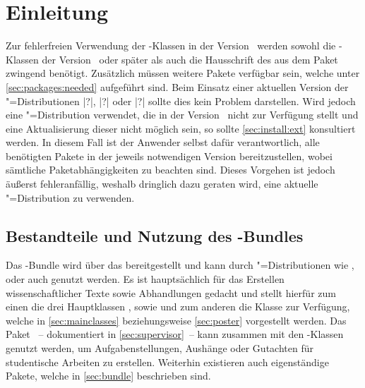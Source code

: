 \chapter{Einleitung}
%
Zur fehlerfreien Verwendung der \TUDScript-Klassen in der Version~\vTUDScript{} 
werden sowohl die \KOMAScript-Klassen der Version~\vKOMAScript{} oder später 
als auch die Hausschrift des \CDs \OpenSans aus dem Paket  
zwingend benötigt. Zusätzlich müssen weitere Pakete verfügbar sein, welche 
unter \autoref{sec:packages:needed} aufgeführt sind. Beim Einsatz einer 
aktuellen Version der "=Distributionen 
|?|, |?| oder 
|?| sollte dies kein Problem darstellen. Wird 
jedoch eine "=Distribution verwendet, die \TUDScript in der 
Version~\vTUDScript{} nicht zur Verfügung stellt und eine Aktualisierung dieser 
nicht möglich sein, so sollte \autoref{sec:install:ext} konsultiert werden. In 
diesem Fall ist der Anwender selbst dafür verantwortlich, alle benötigten 
Pakete in der jeweils notwendigen Version bereitzustellen, wobei sämtliche 
Paketabhängigkeiten zu beachten sind. Dieses Vorgehen ist jedoch äußerst 
fehleranfällig, weshalb dringlich dazu geraten wird, eine aktuelle 
"=Distribution zu verwenden.



\section{Bestandteile und Nutzung des \TUDScript-Bundles}
%
%
Das \TUDScript-Bundle wird über das \CTAN bereitgestellt und kann durch 
"=Distributionen wie , 
 oder auch  
genutzt werden. Es ist hauptsächlich für das Erstellen wissenschaftlicher 
Texte sowie Abhandlungen gedacht und stellt hierfür zum einen die drei 
Hauptklassen ,  sowie  
und zum anderen die Klasse  zur Verfügung, welche in 
\autoref{sec:mainclasses} beziehungsweise \autoref{sec:poster} vorgestellt 
werden. Das Paket ~-- dokumentiert in 
\autoref{sec:supervisor}~-- kann zusammen mit den \TUDScript-Klassen genutzt 
werden, um Aufgabenstellungen, Aushänge oder Gutachten für studentische 
Arbeiten zu erstellen. Weiterhin existieren auch eigenständige Pakete, welche 
in \autoref{sec:bundle} beschrieben sind. 

